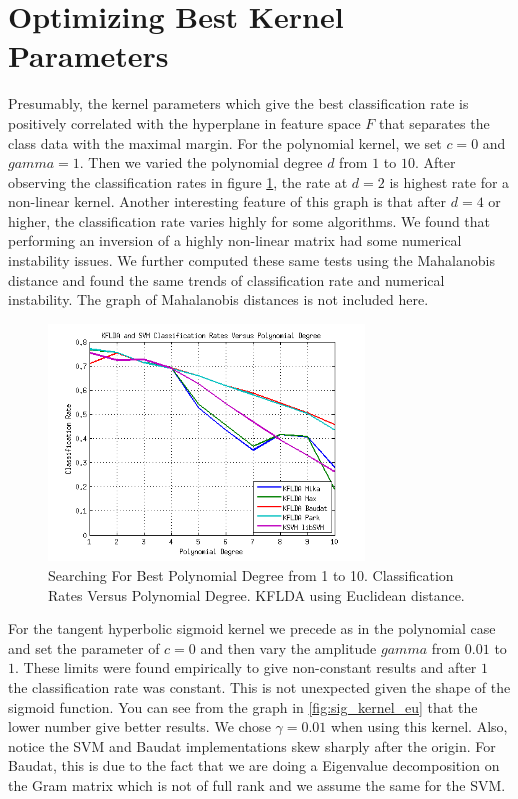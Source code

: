 \documentclass[journal]{IEEEtran}
\begin{document}
\section{Optimizing Best Kernel Parameters}
\par Presumably, the kernel parameters which give the best classification rate is positively correlated with the hyperplane in feature space \(F\) that separates the class data with the maximal margin. For the polynomial kernel, we set \(c = 0\) and \(gamma=1\). Then we varied the polynomial degree \(d\) from \(1\) to \(10\). After observing the classification rates in figure \ref{fig:poly_kernel_eu}, the rate at \(d=2\) is highest rate for a non-linear kernel. Another interesting feature of this graph is that after \(d=4\) or higher, the classification rate varies highly for some algorithms. We found that performing an inversion of a highly non-linear matrix had some numerical instability issues. We further computed these same tests using the Mahalanobis distance and found the same trends of classification rate and numerical instability. The graph of Mahalanobis distances is not included here.
 
\begin{figure}[!h]
\centering
\includegraphics[width=3.3in]{../images/poly_kernel_optimize_2.png}
\caption{Searching For Best Polynomial Degree from 1 to 10. Classification Rates Versus Polynomial Degree. KFLDA using Euclidean distance.}
\label{fig:poly_kernel_eu}
\end{figure}

\par For the tangent hyperbolic sigmoid kernel we precede as in the polynomial case and set the parameter of \(c=0\) and then vary the amplitude \(gamma\) from \(0.01\) to \(1\). These limits were found empirically to give non-constant results and after \(1\) the classification rate was constant. This is not unexpected given the shape of the sigmoid function. You can see from the graph in \ref{fig:sig_kernel_eu} that the lower number give better results. We chose \(\gamma=0.01\) when using this kernel. Also, notice the SVM and Baudat implementations skew sharply after the origin. For Baudat, this is due to the fact that we are doing a Eigenvalue decomposition on the Gram matrix which is not of full rank and we assume the same for the SVM.
\end{document}
